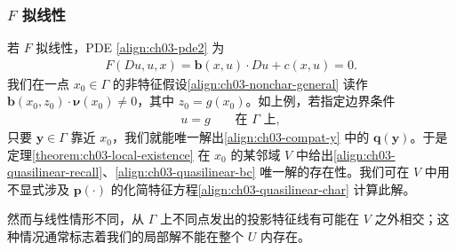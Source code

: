 \documentclass[../../main.tex]{subfiles}
\begin{document}
\subsubsection{$F$ 拟线性}

若 $F$ 拟线性，PDE \eqref{align:ch03-pde2} 为
\begin{align}\label{align:ch03-quasilinear-recall}
F(Du,u,x)=\mathbf{b}(x,u)\cdot Du+c(x,u)=0.
\end{align}
我们在一点 $x_0\in\Gamma$ 的非特征假设\eqref{align:ch03-nonchar-general} 读作 $\mathbf{b}(x_0,z_0)\cdot\boldsymbol{\nu}(x_0)\neq 0$，其中 $z_0=g(x_0)$。如上例，若指定边界条件
\begin{align}\label{align:ch03-quasilinear-bc}
u=g \qquad \text{在 }\Gamma\text{ 上},
\end{align}
只要 $\mathbf{y}\in\Gamma$ 靠近 $x_0$，我们就能唯一解出\eqref{align:ch03-compat-y} 中的 $\mathbf{q}(\mathbf{y})$。于是定理\cref{theorem:ch03-local-existence} 在 $x_0$ 的某邻域 $V$ 中给出\eqref{align:ch03-quasilinear-recall}、\eqref{align:ch03-quasilinear-bc} 唯一解的存在性。我们可在 $V$ 中用不显式涉及 $\mathbf{p}(\cdot)$ 的化简特征方程\eqref{align:ch03-quasilinear-char} 计算此解。

然而与线性情形不同，从 $\Gamma$ 上不同点发出的投影特征线有可能在 $V$ 之外相交；这种情况通常标志着我们的局部解不能在整个 $U$ 内存在。
\end{document}
